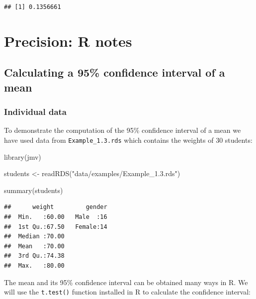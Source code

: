 \documentclass[
]{memoir}
\newenvironment{Shaded}{\begin{snugshade}}{\end{snugshade}}
\newcommand{\FunctionTok}[1]{\textcolor[rgb]{0.00,0.00,0.00}{#1}}
\newcommand{\NormalTok}[1]{#1}
\newcommand{\OtherTok}[1]{\textcolor[rgb]{0.56,0.35,0.01}{#1}}
\newcommand{\SpecialCharTok}[1]{\textcolor[rgb]{0.00,0.00,0.00}{#1}}
\newcommand{\StringTok}[1]{\textcolor[rgb]{0.31,0.60,0.02}{#1}}
\begin{document}
\begin{verbatim}
## [1] 0.1356661
\end{verbatim}

\hypertarget{precision-r-notes}{%
\chapter{Precision: R notes}\label{precision-r-notes}}

\hypertarget{calculating-a-95-confidence-interval-of-a-mean}{%
\section{Calculating a 95\% confidence interval of a mean}\label{calculating-a-95-confidence-interval-of-a-mean}}

\hypertarget{individual-data}{%
\subsection{Individual data}\label{individual-data}}

To demonstrate the computation of the 95\% confidence interval of a mean we have used data from \texttt{Example\_1.3.rds} which contains the weights of 30 students:

\begin{Shaded}
\begin{Highlighting}[]
\FunctionTok{library}\NormalTok{(jmv)}

\NormalTok{students }\OtherTok{\textless{}{-}} \FunctionTok{readRDS}\NormalTok{(}\StringTok{"data/examples/Example\_1.3.rds"}\NormalTok{)}

\FunctionTok{summary}\NormalTok{(students)}
\end{Highlighting}
\end{Shaded}

\begin{verbatim}
##      weight         gender  
##  Min.   :60.00   Male  :16  
##  1st Qu.:67.50   Female:14  
##  Median :70.00              
##  Mean   :70.00              
##  3rd Qu.:74.38              
##  Max.   :80.00
\end{verbatim}

The mean and its 95\% confidence interval can be obtained many ways in R. We will use the \texttt{t.test()} function installed in R to calculate the confidence interval:

\begin{Shaded}
\end{Shaded}
\end{document}
